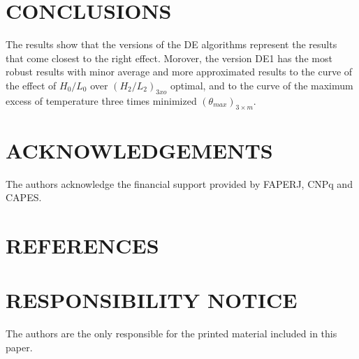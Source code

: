 \documentclass[10pt,fleqn,a4paper,twoside]{article}
\begin{document}
\section{CONCLUSIONS}

The results show that the versions of the DE algorithms represent the results that come closest to the right effect. Morover, the version DE1 has the most robust results with minor average and more approximated results to the curve of the effect of $H_{0}/L_{0}$ over $(H_{2}/L_{2})_{3xo}$ optimal, and to the curve of the maximum excess of temperature three times minimized $({\theta}_{max})_{3\times m}$.


\section{ACKNOWLEDGEMENTS}

The authors acknowledge the financial support provided by FAPERJ, CNPq and CAPES.

\section{REFERENCES} 


\renewcommand{\refname}{}


\section{RESPONSIBILITY NOTICE}

The authors are the only responsible for the printed material included in this paper.
\end{document}
